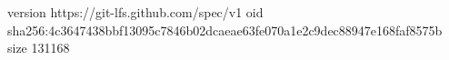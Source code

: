 version https://git-lfs.github.com/spec/v1
oid sha256:4c3647438bbf13095c7846b02dcaeae63fe070a1e2c9dec88947e168faf8575b
size 131168
